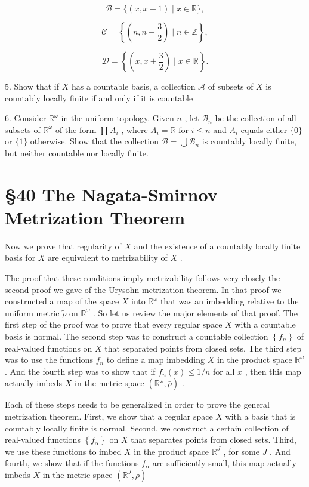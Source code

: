 \[
\mathcal{B} = \{ \left( {x,x + 1}\right)  \mid  x \in  \mathbb{R}\} ,
\]

\[
\mathcal{C} = \left\{  {\left( {n,n + \frac{3}{2}}\right)  \mid  n \in  \mathbb{Z}}\right\}  ,
\]

\[
\mathcal{D} = \left\{  {\left( {x,x + \frac{3}{2}}\right)  \mid  x \in  \mathbb{R}}\right\}  .
\]

5. Show that if \(X\) has a countable basis, a collection \(\mathcal{A}\) of subsets of \(X\) is countably locally finite if and only if it is countable

6. Consider \({\mathbb{R}}^{\omega }\) in the uniform topology. Given \(n\) , let \({\mathcal{B}}_{n}\) be the collection of all subsets of \({\mathbb{R}}^{\omega }\) of the form \(\prod {A}_{i}\) , where \({A}_{i} = \mathbb{R}\) for \(i \leq  n\) and \({A}_{i}\) equals either \(\{ 0\}\) or \(\{ 1\}\) otherwise. Show that the collection \(\mathcal{B} = \bigcup {\mathcal{B}}_{n}\) is countably locally finite, but neither countable nor locally finite.

\section*{§40 The Nagata-Smirnov Metrization Theorem}

Now we prove that regularity of \(X\) and the existence of a countably locally finite basis for \(X\) are equivalent to metrizability of \(X\) .

The proof that these conditions imply metrizability follows very closely the second proof we gave of the Urysohn metrization theorem. In that proof we constructed a map of the space \(X\) into \({\mathbb{R}}^{\omega }\) that was an imbedding relative to the uniform metric \(\widetilde{\rho }\) on \({\mathbb{R}}^{\omega }\) . So let us review the major elements of that proof. The first step of the proof was to prove that every regular space \(X\) with a countable basis is normal. The second step was to construct a countable collection \(\left\{  {f}_{n}\right\}\) of real-valued functions on \(X\) that separated points from closed sets. The third step was to use the functions \({f}_{n}\) to define a map imbedding \(X\) in the product space \({\mathbb{R}}^{\omega }\) . And the fourth step was to show that if \({f}_{n}\left( x\right)  \leq  1/n\) for all \(x\) , then this map actually imbeds \(X\) in the metric space \(\left( {{\mathbb{R}}^{\omega },\bar{\rho }}\right)\) .

Each of these steps needs to be generalized in order to prove the general metrization theorem. First, we show that a regular space \(X\) with a basis that is countably locally finite is normal. Second, we construct a certain collection of real-valued functions \(\left\{  {f}_{\alpha }\right\}\) on \(X\) that separates points from closed sets. Third, we use these functions to imbed \(X\) in the product space \({\mathbb{R}}^{J}\) , for some \(J\) . And fourth, we show that if the functions \({f}_{\alpha }\) are sufficiently small, this map actually imbeds \(X\) in the metric space \(\left( {{\mathbb{R}}^{J},\bar{\rho }}\right)\)

